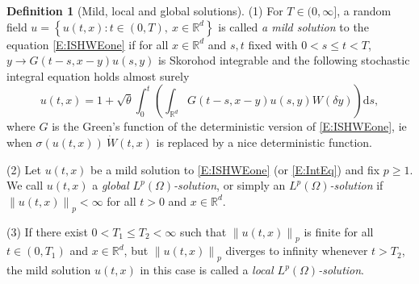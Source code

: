 \documentclass[a4paper,11pt]{article}
\numberwithin{equation}{section}
\theoremstyle{plain}
\theoremstyle{definition}
\newtheorem{definition}[theorem]{Definition}
\newcommand{\ud}{\ensuremath{\mathrm{d} }}
\newcommand{\Norm}[1]{\left\|  #1   \right\|}
\newcommand{\R}{\mathbb{R}}
\numberwithin{NQ}{section}
\numberwithin{LQ}{section}
\numberwithin{ZQ}{section}
\begin{document}
\begin{definition}[Mild, local and global solutions]
	\label{D:ISHWEoneSol}
	(1) For $T\in (0,\infty]$, a random field $u=\left\{u(t,x) : t \in (0,T),\: x\in\R^d\right\}$ is
	called {\it a mild solution} to the equation \eqref{E:ISHWEone} if for all $x\in\R^d$ and $s,t$ fixed
	with $0<s\le t <T$, $y\to G(t-s,x-y)u(s,y)$ is Skorohod integrable and the following stochastic
	integral equation holds almost surely
	\begin{equation}
	\label{E:IntEq}
	u(t,x) = 1 + \sqrt{\theta}\int_0^t \left( \int_{\R^d} G(t-s,x-y)u(s,y) W(\delta y) \right)\ud s,
	\end{equation}
	where $G$ is the Green's function of the deterministic version of \eqref{E:ISHWEone}, ie when $\sigma( u(t,x)) \: \dot W(t,x)$ is replaced by a nice deterministic function.
	
	\noindent (2) Let $u(t,x)$ be a mild solution to \eqref{E:ISHWEone} (or \eqref{E:IntEq}) and fix $p\ge 1$. We call $u(t,x)$ a {\it global $L^p(\Omega)$-solution}, or simply an {\it $L^p(\Omega)$-solution} if $\Norm{u(t,x)}_p < \infty$ for all $t>0$ and $x \in \R^d$. 
	
	\noindent (3) If there exist $0<T_1\le T_2<\infty$ such that $\Norm{u(t,x)}_p$ is finite for all
	$t\in(0,T_1)$ and $x\in\R^d$, but $\Norm{u(t,x)}_p$ diverges to infinity whenever $t>T_2$, the mild
	solution $u(t,x)$ in this case is called a {\it local $L^p(\Omega)$-solution}.
\end{definition}
\end{document}
